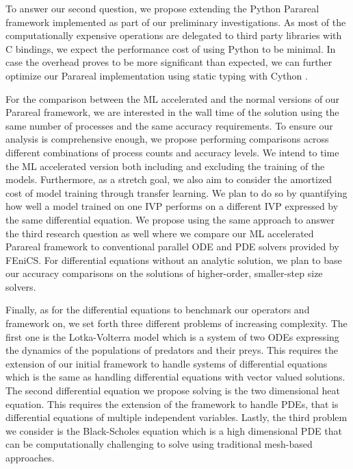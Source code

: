 \documentclass{article}
\begin{document}
To answer our second question, we propose extending the Python Parareal framework implemented as part of our preliminary investigations. As most of the computationally expensive operations are delegated to third party libraries with C bindings, we expect the performance cost of using Python to be minimal. In case the overhead proves to be more significant than expected, we can further optimize our Parareal implementation using static typing with Cython \cite{behnel2010}.

For the comparison between the ML accelerated and the normal versions of our Parareal framework, we are interested in the wall time of the solution using the same number of processes and the same accuracy requirements. To ensure our analysis is comprehensive enough, we propose performing comparisons across different combinations of process counts and accuracy levels. We intend to time the ML accelerated version both including and excluding the training of the models. Furthermore, as a stretch goal, we also aim to consider the amortized cost of model training through transfer learning. We plan to do so by quantifying how well a model trained on one IVP performs on a different IVP expressed by the same differential equation. We propose using the same approach to answer the third research question as well where we compare our ML accelerated Parareal framework to conventional parallel ODE and PDE solvers provided by FEniCS. For differential equations without an analytic solution, we plan to base our accuracy comparisons on the solutions of higher-order, smaller-step size solvers.

Finally, as for the differential equations to benchmark our operators and framework on, we set forth three different problems of increasing complexity. The first one is the Lotka-Volterra model \cite{lotka1926} which is a system of two ODEs expressing the dynamics of the populations of predators and their preys. This requires the extension of our initial framework to handle systems of differential equations which is the same as handling differential equations with vector valued solutions. The second differential equation we propose solving is the two dimensional heat equation. This requires the extension of the framework to handle PDEs, that is differential equations of multiple independent variables. Lastly, the third problem we consider is the Black-Scholes equation \cite{black1973} which is a high dimensional PDE that can be computationally challenging to solve using traditional mesh-based approaches.
\end{document}
